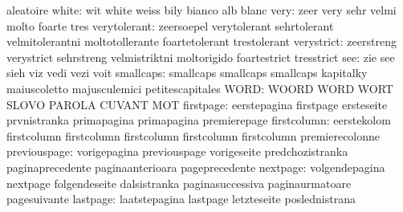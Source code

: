                            aleatoire
                    white: wit                       white
                           weiss                     bily
                           bianco                    alb
                           blanc
                     very: zeer                      very
                           sehr                      velmi
                           molto                     foarte
                           tres
             verytolerant: zeersoepel                verytolerant
                           sehrtolerant              velmitolerantni
                           moltotollerante           foartetolerant
                           trestolerant
               verystrict: zeerstreng                verystrict
                           sehrstreng                velmistriktni
                           moltorigido               foartestrict
                           tresstrict
                      see: zie                       see
                           sieh                      viz
                           vedi                      vezi
                           voit
                smallcaps: smallcaps                 smallcaps
                           smallcaps                 kapitalky
                           maiuscoletto              majusculemici
                           petitescapitales
                     WORD: WOORD                     WORD
                           WORT                      SLOVO
                           PAROLA                    CUVANT
                           MOT
                firstpage: eerstepagina              firstpage
                           ersteseite                prvnistranka
                           primapagina               primapagina
                           premierepage
              firstcolumn: eerstekolom               firstcolumn
                           firstcolumn               firstcolumn
                           firstcolumn               firstcolumn
                           premierecolonne
             previouspage: vorigepagina              previouspage
                           vorigeseite               predchozistranka
                           paginaprecedente          paginaanterioara
                           pageprecedente
                 nextpage: volgendepagina            nextpage
                           folgendeseite             dalsistranka
                           paginasuccessiva          paginaurmatoare
                           pagesuivante
                 lastpage: laatstepagina             lastpage
                           letzteseite               poslednistrana
